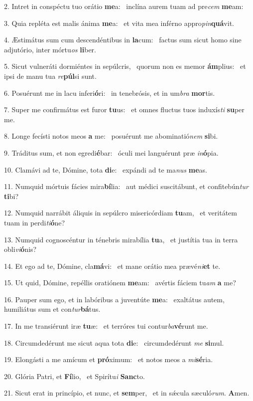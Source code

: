 2. Intret in conspéctu tuo orátio \textbf{me}a: \ast\  inclína aurem tuam ad pre\textit{cem} \textbf{me}am:\

3. Quia repléta est malis ánima \textbf{me}a: \ast\  et vita mea inférno appro\textit{pin}\textbf{quá}vit.\

4. Æstimátus sum cum descendéntibus in \textbf{la}cum: \ast\  factus sum sicut homo sine adjutório, inter mórtu\textit{os} \textbf{li}ber.\

5. Sicut vulneráti dormiéntes in sepúlcris, \dag\  quorum non es memor \textbf{ám}plius: \ast\  et ipsi de manu tua \textit{re}\textbf{púl}si sunt.\

6. Posuérunt me in lacu inferi\textbf{ó}ri: \ast\  in tenebrósis, et in um\textit{bra} \textbf{mor}tis.\

7. Super me confirmátus est furor \textbf{tu}us: \ast\  et omnes fluctus tuos induxís\textit{ti} \textbf{su}per me.\

8. Longe fecísti notos meos \textbf{a} me: \ast\  posuérunt me abominatió\textit{nem} \textbf{si}bi.\

9. Tráditus sum, et non egredi\textbf{é}bar: \ast\  óculi mei languérunt præ \textit{in}\textbf{ó}pia.\

10. Clamávi ad te, Dómine, tota \textbf{di}e: \ast\  expándi ad te ma\textit{nus} \textbf{me}as.\

11. Numquid mórtuis fácies mira\textbf{bí}lia: \ast\  aut médici suscitábunt, et confitebún\textit{tur} \textbf{ti}bi?\

12. Numquid narrábit áliquis in sepúlcro misericórdiam \textbf{tu}am, \ast\  et veritátem tuam in perdi\textit{ti}\textbf{ó}ne?\

13. Numquid cognoscéntur in ténebris mirabília \textbf{tu}a, \ast\  et justítia tua in terra obli\textit{vi}\textbf{ó}nis?\

14. Et ego ad te, Dómine, cla\textbf{má}vi: \ast\  et mane orátio mea prævé\textit{ni}\textbf{et} te.\

15. Ut quid, Dómine, repéllis oratiónem \textbf{me}am: \ast\  avértis fáciem tu\textit{am} \textbf{a} me?\

16. Pauper sum ego, et in labóribus a juventúte \textbf{me}a: \ast\  exaltátus autem, humiliátus sum et con\textit{tur}\textbf{bá}tus.\

17. In me transiérunt iræ \textbf{tu}æ: \ast\  et terróres tui contur\textit{ba}\textbf{vé}runt me.\

18. Circumdedérunt me sicut aqua tota \textbf{di}e: \ast\  circumdedérunt \textit{me} \textbf{si}mul.\

19. Elongásti a me amícum et \textbf{pró}ximum: \ast\  et notos meos a \textit{mi}\textbf{sé}ria.\

20. Glória Patri, et \textbf{Fí}lio, \ast\  et Spirítu\textit{i} \textbf{Sanc}to.\

21. Sicut erat in princípio, et nunc, et \textbf{sem}per, \ast\  et in sǽcula sæculó\textit{rum}. \textbf{A}men.\

